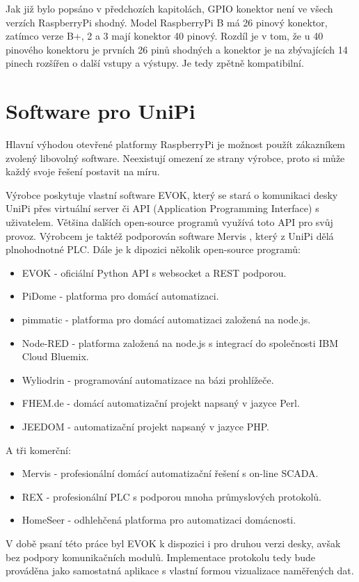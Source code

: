 Jak již bylo popsáno v předchozích kapitolách, GPIO konektor není ve všech verzích RaspberryPi shodný. Model RaspberryPi B má 26 pinový konektor, zatímco verze B+, 2 a 3 mají konektor 40 pinový. Rozdíl je v tom, že u 40 pinového konektoru je prvních 26 pinů shodných a konektor je na zbývajících 14 pinech rozšířen o další vstupy a výstupy. Je tedy zpětně kompatibilní.




\section{Software pro UniPi}

Hlavní výhodou otevřené platformy RaspberryPi je možnost použít zákazníkem zvolený libovolný software. Neexistují omezení ze strany výrobce, proto si může každý svoje řešení postavit na míru.

Výrobce poskytuje vlastní software EVOK, který se stará o komunikaci desky UniPi přes virtuální server či API (Application Programming Interface) s uživatelem. Většina dalších open-source programů využívá toto API pro svůj provoz. Výrobcem je taktéž podporován software Mervis \cite{MervisWeb}, který z UniPi dělá plnohodnotné PLC. Dále je k dipozici několik open-source programů:
\begin{itemize}
\item EVOK - oficiální Python API s websocket a REST podporou.
\item PiDome - platforma pro domácí automatizaci.
\item pimmatic - platforma pro domácí automatizaci založená na node.js.
\item Node-RED - platforma založená na node.js s integrací do společnosti IBM Cloud Bluemix.
\item Wyliodrin - programování automatizace na bázi prohlížeče.
\item FHEM.de - domácí automatizační projekt napsaný v jazyce Perl.
\item JEEDOM - automatizační projekt napsaný v jazyce PHP.
\end{itemize}

\vspace{10pt}
A tři komerční:
\begin{itemize}
\item Mervis - profesionální domácí automatizační řešení s on-line SCADA.
\item REX - profesionální PLC s podporou mnoha průmyslových protokolů.
\item HomeSeer - odhlehčená platforma pro automatizaci domácnosti.
\end{itemize}

\vspace{10pt}
V době psaní této práce byl EVOK k dispozici i pro druhou verzi desky, avšak bez podpory komunikačních modulů. Implementace protokolu tedy bude prováděna jako samostatná aplikace s vlastní formou vizualizace naměřených dat.





 